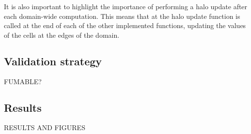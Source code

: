 It is also important to highlight the importance of performing a halo update after each domain-wide computation. This means that at the halo update function is called at the end of each of the other implemented functions, updating the values of the cells at the edges of the domain.

\subsection{Validation strategy}

FUMABLE?

\subsection{Results}

RESULTS AND FIGURES
